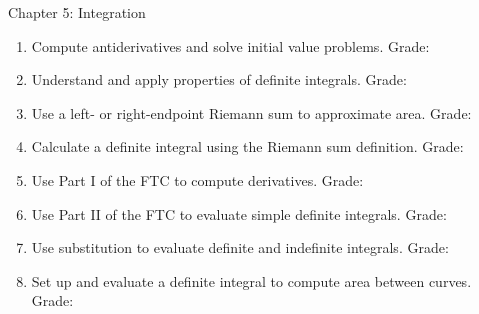 \documentclass[11pt,letterpaper]{amsart}
\begin{document}
\bigskip

Chapter 5: Integration %
\begin{enumerate} 
\item Compute antiderivatives and solve initial value problems.\hspace*{\fill} Grade:  \quad {} \quad {}
\item Understand and apply properties of definite integrals.\hspace*{\fill} Grade:  \quad {} \quad {}
\item Use a left- or right-endpoint Riemann sum to approximate area.\hspace*{\fill} Grade:  \quad {} \quad {}
\item Calculate a definite integral using the Riemann sum definition.\hspace*{\fill} Grade:  \quad {} \quad {}
\item Use Part I of the FTC to compute derivatives.\hspace*{\fill} Grade:  \quad {} \quad {}
\item Use Part II of the FTC to evaluate simple definite integrals.\hspace*{\fill} Grade:  \quad {} \quad {}
\item Use substitution to evaluate definite and indefinite integrals.\hspace*{\fill} Grade:  \quad {} \quad {}
\item Set up and evaluate a definite integral to compute area between curves.\hspace*{\fill} Grade:  \quad {} \quad {}
\end{enumerate}
%
 
\end{document}

